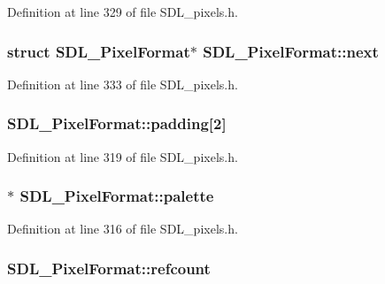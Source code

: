 Definition at line 329 of file S\-D\-L\-\_\-pixels.\-h.

\hypertarget{struct_s_d_l___pixel_format_a1953b66c817116bf81bae4873ee6bce5}{
\subsubsection[{next}]{\setlength{\rightskip}{0pt plus 5cm}struct {\bf S\-D\-L\-\_\-\-Pixel\-Format}$\ast$ S\-D\-L\-\_\-\-Pixel\-Format\-::next}}\label{struct_s_d_l___pixel_format_a1953b66c817116bf81bae4873ee6bce5}


Definition at line 333 of file S\-D\-L\-\_\-pixels.\-h.

\hypertarget{struct_s_d_l___pixel_format_a1f4e276fbda82e60eaff28f61c7cd19e}{
\subsubsection[{padding}]{ S\-D\-L\-\_\-\-Pixel\-Format\-::padding\mbox{[}2\mbox{]}}}\label{struct_s_d_l___pixel_format_a1f4e276fbda82e60eaff28f61c7cd19e}


Definition at line 319 of file S\-D\-L\-\_\-pixels.\-h.

\hypertarget{struct_s_d_l___pixel_format_aeae611aba76f5eb11b696807926c5116}{
\subsubsection[{palette}]{$\ast$ S\-D\-L\-\_\-\-Pixel\-Format\-::palette}}\label{struct_s_d_l___pixel_format_aeae611aba76f5eb11b696807926c5116}


Definition at line 316 of file S\-D\-L\-\_\-pixels.\-h.

\hypertarget{struct_s_d_l___pixel_format_a23be8060443d58064a720a4e2ef31729}{
\subsubsection[{refcount}]{ S\-D\-L\-\_\-\-Pixel\-Format\-::refcount}}\label{struct_s_d_l___pixel_format_a23be8060443d58064a720a4e2ef31729}


